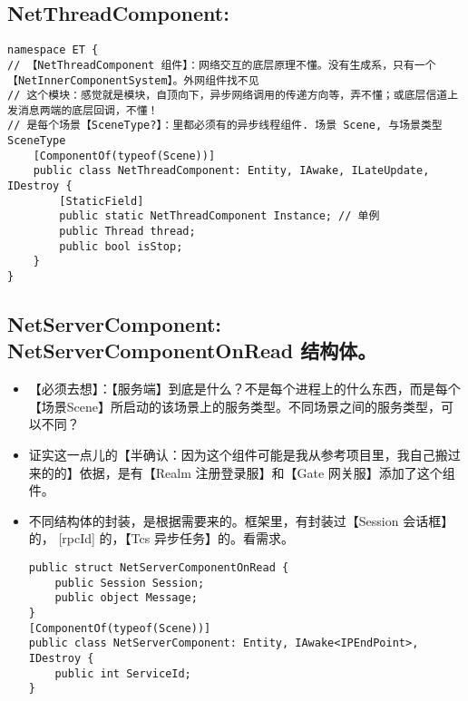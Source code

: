 \documentclass[9pt, b5paper]{article}
\begin{document}
\subsection{NetThreadComponent:}
\label{sec-3-2}
\begin{verbatim}
namespace ET {
// 【NetThreadComponent 组件】：网络交互的底层原理不懂。没有生成系，只有一个【NetInnerComponentSystem】。外网组件找不见
// 这个模块：感觉就是模块，自顶向下，异步网络调用的传递方向等，弄不懂；或底层信道上发消息两端的底层回调，不懂！
// 是每个场景【SceneType?】：里都必须有的异步线程组件. 场景 Scene, 与场景类型SceneType
    [ComponentOf(typeof(Scene))] 
    public class NetThreadComponent: Entity, IAwake, ILateUpdate, IDestroy {
        [StaticField]
        public static NetThreadComponent Instance; // 单例
        public Thread thread;
        public bool isStop;
    }
}
\end{verbatim}
\subsection{NetServerComponent: NetServerComponentOnRead 结构体。}
\label{sec-3-3}
\begin{itemize}
\item 【必须去想】：【服务端】到底是什么？不是每个进程上的什么东西，而是每个【场景Scene】所启动的该场景上的服务类型。不同场景之间的服务类型，可以不同？
\item 证实这一点儿的【半确认：因为这个组件可能是我从参考项目里，我自己搬过来的的】依据，是有【Realm 注册登录服】和【Gate 网关服】添加了这个组件。
\item 不同结构体的封装，是根据需要来的。框架里，有封装过【Session 会话框】的， [rpcId] 的，【Tcs 异步任务】的。看需求。 
\begin{verbatim}
public struct NetServerComponentOnRead {
    public Session Session;
    public object Message;
}
[ComponentOf(typeof(Scene))]
public class NetServerComponent: Entity, IAwake<IPEndPoint>, IDestroy {
    public int ServiceId;
}
\end{verbatim}
\end{itemize}
\end{document}
